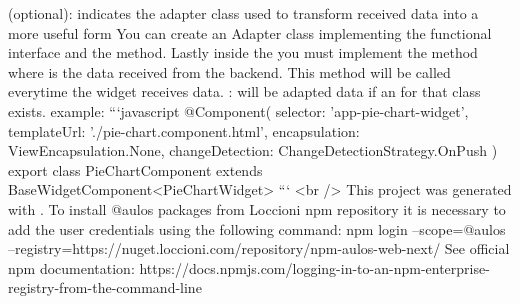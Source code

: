 \markdownRendererUlItem {} (optional): indicates the adapter class used to transform received data into a more useful form\markdownRendererUlItemEnd 
\markdownRendererUlEndTight \markdownRendererInterblockSeparator
{}You can create an Adapter class implementing the  functional interface and the  method.\markdownRendererInterblockSeparator
{}\markdownRendererInterblockSeparator
{}Lastly inside the  you must implement the  method where  is the data received from the backend. This method will be called everytime the widget receives data.\markdownRendererInterblockSeparator
{}:  will be adapted data if an  for that class exists.\markdownRendererInterblockSeparator
{} example:\markdownRendererInterblockSeparator
{}```javascript @Component(\markdownRendererLeftBrace{} selector: 'app-pie-chart-widget', templateUrl: './pie-chart.component.html', encapsulation: ViewEncapsulation.None, changeDetection: ChangeDetectionStrategy.OnPush \markdownRendererRightBrace{}) export class PieChartComponent extends BaseWidgetComponent<PieChartWidget> \markdownRendererLeftBrace{}\markdownRendererInterblockSeparator
{}\markdownRendererInterblockSeparator
{}\markdownRendererRightBrace{} ```\markdownRendererInterblockSeparator
{}<br />\markdownRendererInterblockSeparator
{}\markdownRendererInterblockSeparator
{}This project was generated with .\markdownRendererInterblockSeparator
{}\markdownRendererInterblockSeparator
{}To install @aulos packages from Loccioni npm repository it is necessary to add the user credentials using the following command:\markdownRendererInterblockSeparator
{}npm login --scope=@aulos --registry=https://nuget.loccioni.com/repository/npm-aulos-web-next/\markdownRendererInterblockSeparator
{}See official npm documentation: https://docs.npmjs.com/logging-in-to-an-npm-enterprise-registry-from-the-command-line\markdownRendererInterblockSeparator
